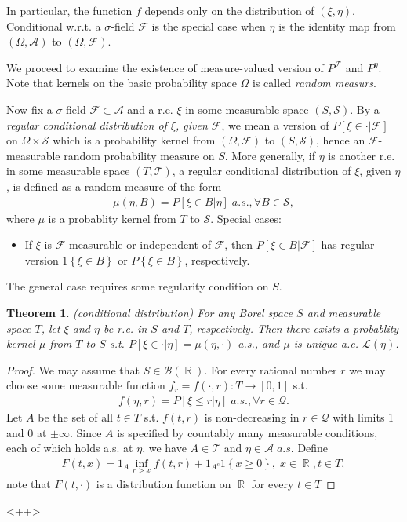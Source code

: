 \documentclass[12pt,a4paper]{article}
\newcommand{\R}{\mathop{\mathbb{R}}}
\def \A {\mathcal{A}}
\def \B {\mathcal{B}}
\def \L {\mathcal{L}}
\def \S {\mathcal{S}}
\def \T {\mathcal{T}}
\def \Q {\mathcal{Q}}
\def \F {\mathcal{F}}
\newtheorem{theorem}{Theorem}[section]
\begin{document}
In particular, the function $f$ depends only on the distribution of $(\xi,\eta)$. Conditional w.r.t. a $\sigma$-field $\F$ is the special case when $\eta$ is the identity map from $(\Omega,\A)$ to $(\Omega,\F)$.


We proceed to examine the existence of measure-valued version of $P^{\F}$ and $P^{\eta}$. Note that kernels on the basic probability space $\Omega$ is called {\em random measurs}.

Now fix a $\sigma$-field $\F\subset \A$ and a r.e. $\xi$ in some measurable space $(S,\S)$. By a {\em regular conditional distribution of $\xi$, given $\F$}, we mean a version of $P\left[ \xi\in\cdot|\F \right]$ on $\Omega\times\S$ which is a probability kernel from $(\Omega,\F)$ to $(S,\S)$, hence an $\F$-measurable random probability measure on $S$. More generally, if $\eta$ is another r.e. in some measurable space $(T,\T)$, a regular conditional distribution of $\xi$, given $\eta$, is defined as a random measure of the form
\begin{align*}
  \mu(\eta,B) = P[\xi\in B | \eta]\; a.s.,\forall B\in \S,
\end{align*}
where $\mu$ is a probablity kernel from $T$ to $\S$.
Special cases:
\begin{itemize}
  \item If $\xi$ is $\F$-measurable or independent of $\F$, then $P[\xi\in B|\F] $ has regular version $1\left\{ \xi\in B \right\}$ or $P\left\{ \xi \in B \right\}$, respectively. 
\end{itemize}
The general case requires some regularity condition on $S$.

\begin{theorem}
  (conditional distribution) For any Borel space $S$ and measurable space $T$, let $\xi$ and $\eta$ be r.e. in $S$ and $T$, respectively. Then there exists a probablity kernel $\mu$ from $T$ to $S$ s.t. $P[\xi\in\cdot|\eta] = \mu(\eta,\cdot)$ a.s., and $\mu$ is unique a.e. $\L(\eta)$.
  \label{thm:conditionalDistribution}
\end{theorem}

\begin{proof}
  We may assume that $S \in \B(\R)$. For every rational number $r$ we may choose some measurable function $f_r = f(\cdot, r):T\to[0,1]$ s.t. 
  \begin{align*}
    f(\eta,r) = P[\xi\le r | \eta]\; a.s., \forall r\in\Q.
  \end{align*}
Let $A$ be the set of all $t\in T$ s.t. $f(t,r)$ is non-decreasing in $r\in \Q$ with limits 1 and 0 at $\pm \infty$. Since $A$ is specified by countably many measurable conditions, each of which holds a.s. at $\eta$, we have $A\in\T$ and $\eta \in \A \;a.s.$ Define
\begin{align*}
  F(t,x) = 1_{A}\inf_{r>x} f(t,r) + 1_{A^c}1\left\{ x\ge 0 \right\}, \; x\in\R,t\in T,
\end{align*}
note that $F(t,\cdot)$ is a distribution function on $\R$ for every $t\in T$
\end{proof}<++>
\end{document}

